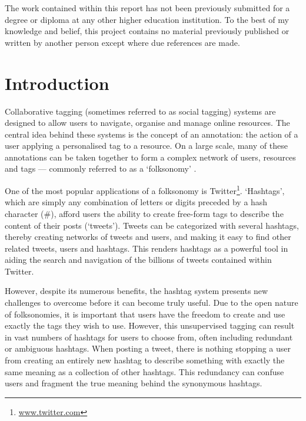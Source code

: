 \documentclass[11pt,a4paper]{report}
\begin{document}
The work contained within this report has not been previously submitted for a degree or diploma at any other higher education institution. To the best of my knowledge and belief, this project contains no material previously published or written by another person except where due references are made.

\pagebreak

\setcounter{page}{1}

\chapter{Introduction}
\label{chap:introduction}
Collaborative tagging (sometimes referred to as social tagging) systems are designed to allow users to navigate, organise and manage online resources. The central idea behind these systems is the concept of an annotation: the action of a user applying a personalised tag to a resource. On a large scale, many of these annotations can be taken together to form a complex network of users, resources and tags --- commonly referred to as a `folksonomy' \parencite{Xu:2008}.

One of the most popular applications of a folksonomy is Twitter\footnote{\url{www.twitter.com}}. `Hashtags', which are simply any combination of letters or digits preceded by a hash character (\#), afford users the ability to create free-form tags to describe the content of their posts (`tweets'). Tweets can be categorized with several hashtags, thereby creating networks of tweets and users, and making it easy to find other related tweets, users and hashtags. This renders hashtags as a powerful tool in aiding the search and navigation of the billions of tweets contained within Twitter.

However, despite its numerous benefits, the hashtag system presents new challenges to overcome before it can become truly useful. Due to the open nature of folksonomies, it is important that users have the freedom to create and use exactly the tags they wish to use. However, this unsupervised tagging can result in vast numbers of hashtags for users to choose from, often including redundant or ambiguous hashtags. When posting a tweet, there is nothing stopping a user from creating an entirely new hashtag to describe something with exactly the same meaning as a collection of other hashtags. This redundancy can confuse users and fragment the true meaning behind the synonymous hashtags.

\end{document}
